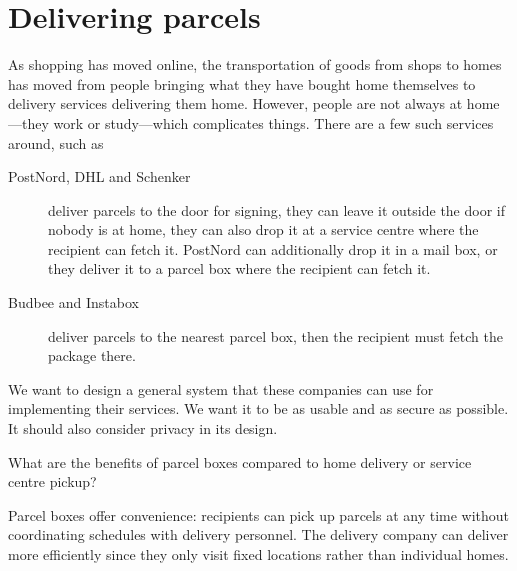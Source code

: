 \chapter{Delivering parcels}\label{ParcelBoxes}

As shopping has moved online, the transportation of goods from shops to homes
has moved from people bringing what they have bought home themselves to
delivery services delivering them home.
However, people are not always at home---they work or study---which complicates
things.
There are a few such services around, such as
\begin{description}
  \item[PostNord, DHL and Schenker] deliver parcels to the door for signing,
    they can leave it outside the door if nobody is at home,
    they can also drop it at a service centre where the recipient can fetch it.
    PostNord can additionally drop it in a mail box, or
    they deliver it to a parcel box where the recipient can fetch it.
  \item[Budbee and Instabox] deliver parcels to the nearest parcel box, then
    the recipient must fetch the package there.
\end{description}

We want to design a general system that these companies can use for
implementing their services.
We want it to be as usable and as secure as possible.
It should also consider privacy in its design.

\begin{exercise}\label{ParcelBenefits}
  What are the benefits of parcel boxes compared to home delivery or
  service centre pickup?
\end{exercise}

Parcel boxes offer convenience: recipients can pick up parcels at any time
without coordinating schedules with delivery personnel.
The delivery company can deliver more efficiently since they only visit fixed
locations rather than individual homes.

